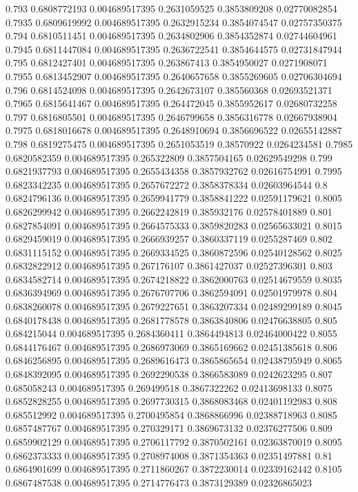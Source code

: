 {0.793 0.6808772193 0.004689517395 0.2631059525 0.3853809208 0.02770082854
0.7935 0.6809619992 0.004689517395 0.2632915234 0.3854074547 0.02757350375
0.794 0.6810511451 0.004689517395 0.2634802906 0.3854352874 0.02744604961
0.7945 0.6811447084 0.004689517395 0.2636722541 0.3854644575 0.02731847944
0.795 0.6812427401 0.004689517395 0.263867413 0.3854950027 0.0271908071
0.7955 0.6813452907 0.004689517395 0.2640657658 0.3855269605 0.02706304694
0.796 0.6814524098 0.004689517395 0.2642673107 0.385560368 0.02693521371
0.7965 0.6815641467 0.004689517395 0.264472045 0.3855952617 0.02680732258
0.797 0.6816805501 0.004689517395 0.2646799658 0.3856316778 0.02667938904
0.7975 0.6818016678 0.004689517395 0.2648910694 0.3856696522 0.02655142887
0.798 0.6819275475 0.004689517395 0.2651053519 0.38570922 0.0264234581
0.7985 0.6820582359 0.004689517395 0.265322809 0.3857504165 0.02629549298
0.799 0.6821937793 0.004689517395 0.2655434358 0.3857932762 0.02616754991
0.7995 0.6823342235 0.004689517395 0.2657672272 0.3858378334 0.02603964544
0.8 0.6824796136 0.004689517395 0.2659941779 0.3858841222 0.02591179621
0.8005 0.6826299942 0.004689517395 0.2662242819 0.385932176 0.02578401889
0.801 0.6827854091 0.004689517395 0.2664575333 0.3859820283 0.02565633021
0.8015 0.6829459019 0.004689517395 0.2666939257 0.3860337119 0.0255287469
0.802 0.6831115152 0.004689517395 0.2669334525 0.3860872596 0.02540128562
0.8025 0.6832822912 0.004689517395 0.267176107 0.3861427037 0.02527396301
0.803 0.6834582714 0.004689517395 0.2674218822 0.3862000763 0.02514679559
0.8035 0.6836394969 0.004689517395 0.2676707706 0.3862594091 0.02501979978
0.804 0.6838260078 0.004689517395 0.2679227651 0.3863207334 0.02489299189
0.8045 0.6840178438 0.004689517395 0.2681778578 0.3863840806 0.02476638805
0.805 0.684215044 0.004689517395 0.2684360411 0.3864494813 0.02464000422
0.8055 0.6844176467 0.004689517395 0.2686973069 0.3865169662 0.02451385618
0.806 0.6846256895 0.004689517395 0.2689616473 0.3865865654 0.02438795949
0.8065 0.6848392095 0.004689517395 0.2692290538 0.3866583089 0.0242623295
0.807 0.685058243 0.004689517395 0.269499518 0.3867322262 0.02413698133
0.8075 0.6852828255 0.004689517395 0.2697730315 0.3868083468 0.02401192983
0.808 0.685512992 0.004689517395 0.2700495854 0.3868866996 0.02388718963
0.8085 0.6857487767 0.004689517395 0.270329171 0.3869673132 0.02376277506
0.809 0.6859902129 0.004689517395 0.2706117792 0.3870502161 0.02363870019
0.8095 0.6862373333 0.004689517395 0.2708974008 0.3871354363 0.02351497881
0.81 0.6864901699 0.004689517395 0.2711860267 0.3872230014 0.02339162442
0.8105 0.6867487538 0.004689517395 0.2714776473 0.3873129389 0.02326865023
}
